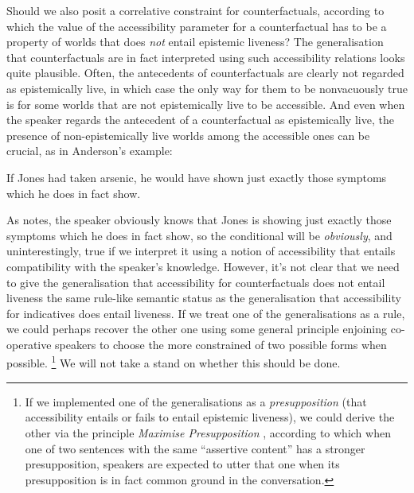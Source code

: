 \documentclass[If.tex]{subfiles}
\begin{document}
Should we also posit a correlative constraint for counterfactuals, according to which the value of the accessibility parameter for a counterfactual has to be a property of worlds that does \emph{not} entail epistemic liveness?  The generalisation that counterfactuals are in fact interpreted using such accessibility relations looks quite plausible.  Often, the antecedents of counterfactuals are clearly not regarded as epistemically live, in which case the only way for them to be nonvacuously true is for some worlds that are not epistemically live to be accessible.  And even when the speaker regards the antecedent of a counterfactual as epistemically live, the presence of non-epistemically live worlds among the accessible ones can be crucial, as in Anderson's example:
\begin{prop}
	\nitem
	If Jones had taken arsenic, he would have shown just exactly those symptoms which he does in fact show.
\end{prop}
As \citet{vonFintelPSC} notes, the speaker obviously knows that Jones is showing just exactly those symptoms which he does in fact show, so the conditional will be \emph{obviously}, and uninterestingly, true if we interpret it using a notion of accessibility that entails compatibility with the speaker's knowledge.  However, it's not clear that we need to give the generalisation that accessibility for counterfactuals does not entail liveness the same rule-like semantic status as the generalisation that accessibility for indicatives does entail liveness.  If we treat one of the generalisations as a rule, we could perhaps recover the other one using some general principle enjoining co-operative speakers to choose the more constrained of two possible forms when possible.%
\footnote{If we implemented one of the generalisations as a \emph{presupposition} (that accessibility entails or fails to entail epistemic liveness), we could derive the other via the principle \emph{Maximise Presupposition} \citep{HeimAD}, according to which when one of two sentences with the same “assertive content” has a stronger presupposition, speakers are expected to utter that one when its presupposition is in fact common ground in the conversation.}
We will not take a stand on whether this should be done.  
\end{document}
